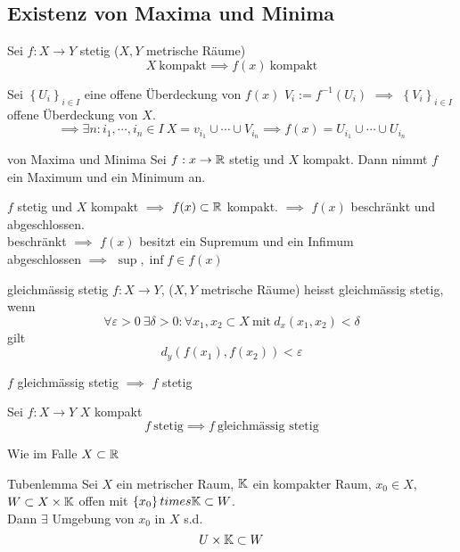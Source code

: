\subsection{Existenz von Maxima und Minima}
\begin{Sat}
  Sei $f:X\to Y$ stetig ($X,Y$ metrische Räume)
  \[X\ \text{kompakt}\implies f(x)\ \text{kompakt}\]
\end{Sat}
\begin{Bew}
  Sei $\left\{ U_i \right\}_{i\in I}$ eine offene Überdeckung von $f(x)$ $V_i:=f^{-1}(U_i)$ $\implies$ $\left\{ V_i \right\}_{i\in I}$ offene Überdeckung von $X$.
  \[\implies\exists n:i_1,\cdots,i_n\in I\ X=v_{i_1}\cup\cdots\cup V_{i_n}\implies f(x)=U_{i_1}\cup\cdots\cup U_{i_n}\]
\end{Bew}
\begin{Sat}{von Maxima und Minima}
  Sei $f:x\to\mathbb{R}$ stetig und $X$ kompakt. Dann nimmt $f$ ein Maximum und ein Minimum an.
\end{Sat}
\begin{Bew}
  $f$ stetig und $X$ kompakt $\implies$ $f(x)\subset\mathbb{R}$ kompakt. $\implies$ $f(x)$ beschränkt und abgeschlossen.\\
  beschränkt $\implies$ $f(x)$ besitzt ein Supremum und ein Infimum\\
  abgeschlossen $\implies$ $\sup, \inf f\in f(x)$
\end{Bew}
\begin{Def}{gleichmässig stetig}
  $f:X\to Y$, ($X,Y$ metrische Räume) heisst gleichmässig stetig, wenn
  \[\forall\varepsilon>0\ \exists \delta>0:\forall x_1,x_2\subset X\ \text{mit}\ d_x(x_1,x_2)<\delta\]
  gilt
  \[d_y\left( f(x_1),f(x_2) \right)<\varepsilon\]
\end{Def}
\begin{Bem}
  $f$ gleichmässig stetig $\implies$ $f$ stetig
\end{Bem}
\begin{Sat}
  Sei $f:X\to Y$ $X$ kompakt
  \[f\ \text{stetig}\implies f\ \text{gleichmässig stetig}\]
\end{Sat}
\begin{Bew}
  Wie im Falle $X\subset\mathbb{R}$  
\end{Bew}
\begin{Lem}{Tubenlemma}
  Sei $X$ ein metrischer Raum, $\mathbb{K}$ ein kompakter Raum, $x_0\in X$, $W\subset X\times \mathbb{K}$ offen mit $\left\{ x_0 \right\}times\mathbb{K}\subset W$.\\
  Dann $\exists$ Umgebung von $x_0$ in $X$ s.d. \[U\times\mathbb{K}\subset W\]
\end{Lem}
